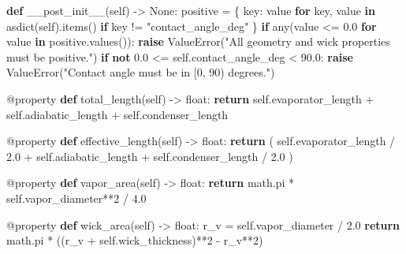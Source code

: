\documentclass[
  12pt,
  12pt,a4paper,oneside]{report}
\newenvironment{Shaded}{}{}
\newcommand{\AttributeTok}[1]{\textcolor[rgb]{0.49,0.56,0.16}{#1}}
\newcommand{\BuiltInTok}[1]{\textcolor[rgb]{0.00,0.50,0.00}{#1}}
\newcommand{\ControlFlowTok}[1]{\textcolor[rgb]{0.00,0.44,0.13}{\textbf{#1}}}
\newcommand{\DecValTok}[1]{\textcolor[rgb]{0.25,0.63,0.44}{#1}}
\newcommand{\FloatTok}[1]{\textcolor[rgb]{0.25,0.63,0.44}{#1}}
\newcommand{\KeywordTok}[1]{\textcolor[rgb]{0.00,0.44,0.13}{\textbf{#1}}}
\newcommand{\NormalTok}[1]{#1}
\newcommand{\OperatorTok}[1]{\textcolor[rgb]{0.40,0.40,0.40}{#1}}
\newcommand{\PreprocessorTok}[1]{\textcolor[rgb]{0.74,0.48,0.00}{#1}}
\newcommand{\StringTok}[1]{\textcolor[rgb]{0.25,0.44,0.63}{#1}}
\newcommand{\VariableTok}[1]{\textcolor[rgb]{0.10,0.09,0.49}{#1}}
\begin{document}
\begin{Shaded}
\begin{Highlighting}[]
    \KeywordTok{def}\NormalTok{ \_\_post\_init\_\_(}\VariableTok{self}\NormalTok{) }\OperatorTok{{-}\textgreater{}} \VariableTok{None}\NormalTok{:}
\NormalTok{        positive }\OperatorTok{=}\NormalTok{ \{}
\NormalTok{            key: value }\ControlFlowTok{for}\NormalTok{ key, value }\KeywordTok{in}\NormalTok{ asdict(}\VariableTok{self}\NormalTok{).items()}
            \ControlFlowTok{if}\NormalTok{ key }\OperatorTok{!=} \StringTok{"contact\_angle\_deg"}
\NormalTok{        \}}
        \ControlFlowTok{if} \BuiltInTok{any}\NormalTok{(value }\OperatorTok{\textless{}=} \FloatTok{0.0} \ControlFlowTok{for}\NormalTok{ value }\KeywordTok{in}\NormalTok{ positive.values()):}
            \ControlFlowTok{raise} \PreprocessorTok{ValueError}\NormalTok{(}\StringTok{"All geometry and wick properties must be positive."}\NormalTok{)}
        \ControlFlowTok{if} \KeywordTok{not} \FloatTok{0.0} \OperatorTok{\textless{}=} \VariableTok{self}\NormalTok{.contact\_angle\_deg }\OperatorTok{\textless{}} \FloatTok{90.0}\NormalTok{:}
            \ControlFlowTok{raise} \PreprocessorTok{ValueError}\NormalTok{(}\StringTok{"Contact angle must be in [0, 90) degrees."}\NormalTok{)}

    \AttributeTok{@property}
    \KeywordTok{def}\NormalTok{ total\_length(}\VariableTok{self}\NormalTok{) }\OperatorTok{{-}\textgreater{}} \BuiltInTok{float}\NormalTok{:}
        \ControlFlowTok{return} \VariableTok{self}\NormalTok{.evaporator\_length }\OperatorTok{+} \VariableTok{self}\NormalTok{.adiabatic\_length }\OperatorTok{+} \VariableTok{self}\NormalTok{.condenser\_length}

    \AttributeTok{@property}
    \KeywordTok{def}\NormalTok{ effective\_length(}\VariableTok{self}\NormalTok{) }\OperatorTok{{-}\textgreater{}} \BuiltInTok{float}\NormalTok{:}
        \ControlFlowTok{return}\NormalTok{ (}
            \VariableTok{self}\NormalTok{.evaporator\_length }\OperatorTok{/} \FloatTok{2.0} \OperatorTok{+} \VariableTok{self}\NormalTok{.adiabatic\_length}
            \OperatorTok{+} \VariableTok{self}\NormalTok{.condenser\_length }\OperatorTok{/} \FloatTok{2.0}
\NormalTok{        )}

    \AttributeTok{@property}
    \KeywordTok{def}\NormalTok{ vapor\_area(}\VariableTok{self}\NormalTok{) }\OperatorTok{{-}\textgreater{}} \BuiltInTok{float}\NormalTok{:}
        \ControlFlowTok{return}\NormalTok{ math.pi }\OperatorTok{*} \VariableTok{self}\NormalTok{.vapor\_diameter}\OperatorTok{**}\DecValTok{2} \OperatorTok{/} \FloatTok{4.0}

    \AttributeTok{@property}
    \KeywordTok{def}\NormalTok{ wick\_area(}\VariableTok{self}\NormalTok{) }\OperatorTok{{-}\textgreater{}} \BuiltInTok{float}\NormalTok{:}
\NormalTok{        r\_v }\OperatorTok{=} \VariableTok{self}\NormalTok{.vapor\_diameter }\OperatorTok{/} \FloatTok{2.0}
        \ControlFlowTok{return}\NormalTok{ math.pi }\OperatorTok{*}\NormalTok{ ((r\_v }\OperatorTok{+} \VariableTok{self}\NormalTok{.wick\_thickness)}\OperatorTok{**}\DecValTok{2} \OperatorTok{{-}}\NormalTok{ r\_v}\OperatorTok{**}\DecValTok{2}\NormalTok{)}


\end{Highlighting}
\end{Shaded}
\end{document}
